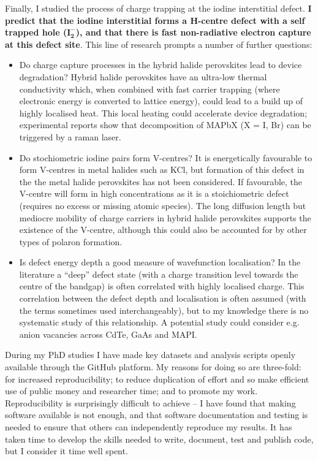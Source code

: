 Finally, I studied the process of charge trapping at the iodine interstitial defect. \textbf{I predict that the iodine interstitial forms a H-centre defect with a self trapped hole ($\mathbf{I_2^-}$), and that there is fast non-radiative electron capture at this defect site}. This line of research prompts a number of further questions:
\begin{itemize}
    \item Do charge capture processes in the hybrid halide perovskites lead to device degradation? Hybrid halide perovskites have an ultra-low thermal conductivity\autocite{Whalley2016} which, when combined with fast carrier trapping (where electronic energy is converted to lattice energy), could lead to a build up of highly localised heat. This local heating could accelerate device degradation; experimental reports show that decomposition of MAPbX (X = I, Br) can be triggered by a raman laser.\autocite{Ledinski2015}
    \item Do stochiometric iodine pairs form V-centres? It is energetically favourable to form V-centres in metal halides such as KCl,\autocite{Castner1957} but formation of this defect in the the metal halide perovskites has not been considered. If favourable, the V-centre will form in high concentrations as it is a stoichiometric defect (requires no excess or missing atomic species). The long diffusion length but mediocre mobility of charge carriers in hybrid halide perovskites\autocite{Brenner2015} supports the existence of the V-centre, although this could also be accounted for by other types of polaron formation. 
    \item Is defect energy depth a good measure of wavefunction localisation? In the literature a ``deep'' defect state (with a charge transition level towards the centre of the bandgap) is often correlated with highly localised charge. This correlation between the defect depth and localisation is often assumed (with the terms sometimes used interchangeably), but to my knowledge there is no systematic study of this relationship. A potential study could consider e.g. anion vacancies across CdTe, GaAs and MAPI.
\end{itemize}

During my PhD studies I have made key datasets and analysis scripts openly available through the GitHub platform. My reasons for doing so are three-fold: for increased reproducibility; to reduce duplication of effort and so make efficient use of public money and researcher time; and to promote my work. Reproducibility is surprisingly difficult to achieve -- I have found that making software available is not enough, and that software documentation and testing is needed to ensure that others can independently reproduce my results. It has taken time to develop the skills needed to write, document, test and publish code, but I consider it time well spent.

